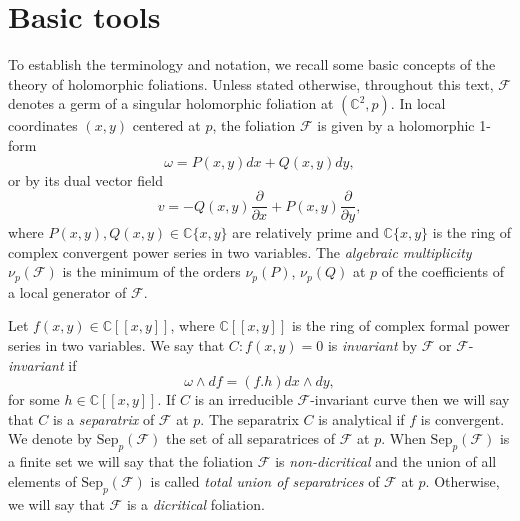 \documentclass[11pt]{amsart}
\newcommand{\C}{\mathbb{C}}
\newcommand{\F}{\mathcal{F}}
\newcommand{\sep}{\mathrm{Sep}}
\begin{document}
\section{Basic tools}
\par  To establish the terminology and notation, we recall  some basic concepts of the theory of holomorphic foliations. Unless stated otherwise, throughout this text, $\F$ denotes a germ of a singular holomorphic foliation at $(\C^2,p)$. In local coordinates $(x,y)$ centered at $p$, the foliation $\F$ is given by a holomorphic 1-form
\begin{equation*}
\omega=P(x,y)dx+Q(x,y)dy,
\end{equation*}
or by its dual vector field
\begin{equation*}
v = -Q(x,y)\frac{\partial}{\partial{x}} + P(x,y)\frac{\partial}{\partial{y}},
\end{equation*}
where  $P(x,y), Q(x,y)   \in \mathbb {C}\{x,y\}$ are relatively prime and ${\mathbb C}\{x,y\}$ is the ring of complex convergent power series in two variables. 
 The \textit{algebraic multiplicity} $\nu_p(\F)$ is the minimum of the orders $\nu_p(P)$, $\nu_p(Q)$ at $p$ of the coefficients of a local generator of $\F$. 
\par Let $f(x,y)\in  \mathbb{C}[[x,y]]$, where ${\mathbb C}[[x,y]]$ is the ring of complex formal power series in two variables.  
We say that $C: f(x,y)=0$  is {\em invariant} by $\F$ or $\F$-\emph{invariant} if $$\omega \wedge d f=(f.h) dx \wedge dy,$$ for some $h\in \mathbb{C}[[x,y]]$. If $C$ is an irreducible $\F$-invariant curve then we will say that $C$ is a {\em separatrix} of $\F$ at $p$. The separatrix $C$ is analytical if $f$ is convergent.  We denote by $\sep_p(\F)$ the set of all separatrices of $\F$ at $p$. When $\sep_p(\F)$ is a finite set we will say that the foliation $\F$ is {\em non-dicritical} and the union of all elements of $\sep_p(\F)$ is called {\em total union of separatrices} of $\F$ at $p$. Otherwise, we will say that $\F$ is a {\em dicritical} foliation.
\end{document}
